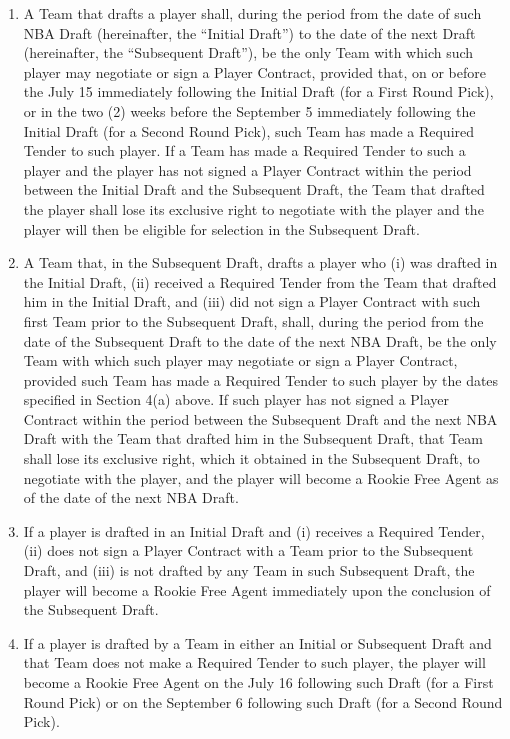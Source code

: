 \documentclass[
]{book}
\providecommand{\tightlist}{%
  \setlength{\itemsep}{0pt}\setlength{\parskip}{0pt}}
\begin{document}
\begin{enumerate}
\def\labelenumi{(\alph{enumi})}
\tightlist
\item
  A Team that drafts a player shall, during the period from the date of such NBA Draft (hereinafter, the ``Initial Draft'') to the date of the next Draft (hereinafter, the ``Subsequent Draft''), be the only Team with which such player may negotiate or sign a Player Contract, provided that, on or before the July 15 immediately following the Initial Draft (for a First Round Pick), or in the two (2) weeks before the September 5 immediately following the Initial Draft (for a Second Round Pick), such Team has made a Required Tender to such player. If a Team has made a Required Tender to such a player and the player has not signed a Player Contract within the period between the Initial Draft and the Subsequent Draft, the Team that drafted the player shall lose its exclusive right to negotiate with the player and the player will then be eligible for selection in the Subsequent Draft.
\item
  A Team that, in the Subsequent Draft, drafts a player who (i) was drafted in the Initial Draft, (ii) received a Required Tender from the Team that drafted him in the Initial Draft, and (iii) did not sign a Player Contract with such first Team prior to the Subsequent Draft, shall, during the period from the date of the Subsequent Draft to the date of the next NBA Draft, be the only Team with which such player may negotiate or sign a Player Contract, provided such Team has made a Required Tender to such player by the dates specified in Section 4(a) above. If such player has not signed a Player Contract within the period between the Subsequent Draft and the next NBA Draft with the Team that drafted him in the Subsequent Draft, that Team shall lose its exclusive right, which it obtained in the Subsequent Draft, to negotiate with the player, and the player will become a Rookie Free Agent as of the date of the next NBA Draft.
\item
  If a player is drafted in an Initial Draft and (i) receives a Required Tender, (ii) does not sign a Player Contract with a Team prior to the Subsequent Draft, and (iii) is not drafted by any Team in such Subsequent Draft, the player will become a Rookie Free Agent immediately upon the conclusion of the Subsequent Draft.
\item
  If a player is drafted by a Team in either an Initial or Subsequent Draft and that Team does not make a Required Tender to such player, the player will become a Rookie Free Agent on the July 16 following such Draft (for a First Round Pick) or on the September 6 following such Draft (for a Second Round Pick).

\end{enumerate}
\end{document}
